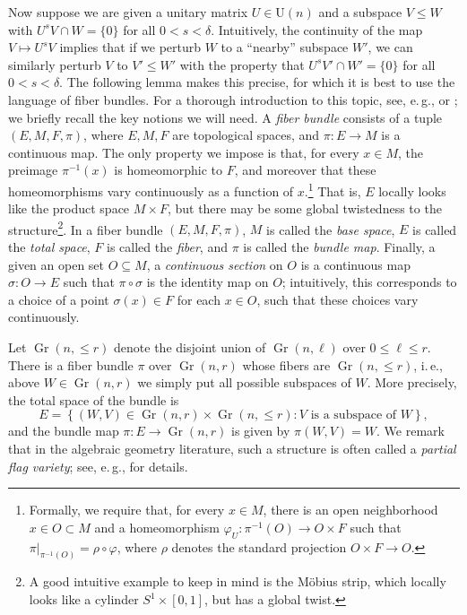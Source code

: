 \documentclass[11pt]{article}
\newcommand{\ie}{i.\,e.}
\newcommand{\eg}{e.\,g.}
\theoremstyle{plain}
\numberwithin{equation}{section}
\theoremstyle{definition}
\DeclareMathOperator\Gr{Gr}
\newcommand{\U}{\mathrm{U}}
\begin{document}
Now suppose we are given a unitary matrix $U\in \U(n)$ and a subspace $V \leq W$ with $U^s V \cap W = \{0\}$ for all $0<s<\delta$. Intuitively, the continuity of the map $V \mapsto U^s V$ implies that if we perturb $W$ to a ``nearby'' subspace $W'$, we can similarly perturb $V$ to $V' \leq W'$ with the property that $U^s V' \cap W' =\{0\}$ for all $0<s<\delta$. The following lemma makes this precise, for which it is best to use the language of fiber bundles. For a thorough introduction to this topic, see, \eg,  \cite{cohen_notes} or \cite[Section III.9]{KMS_books}; we briefly recall the key notions we will need. A \emph{fiber bundle} consists of a tuple $(E,M,F,\pi)$, where $E,M,F$ are topological spaces, and $\pi:E \to M$ is a continuous map. The only property we impose is that, for every $x \in M$, the preimage $\pi^{-1}(x)$ is homeomorphic to $F$, and moreover that these homeomorphisms 
%
vary continuously
%
as a function of $x$.\footnote{Formally, we require that, for every $x \in M$, there is an open neighborhood $x \in O \subset M$ and a homeomorphism $\varphi_U:\pi^{-1}(O) \to O \times F$ such that $\pi|_{\pi^{-1}(O)} = \rho \circ \varphi$, where $\rho$ denotes the standard projection $O \times F \to O$.} That is, $E$ 
%
locally looks like
%
the product space $M \times F$, but there may be some global 
%
twistedness
%
to the structure\footnote{A good intuitive example to keep in mind is the M\"obius strip, which locally looks like a cylinder $S^1 \times [0,1]$, but has a global twist.}. 
In a fiber bundle $(E,M,F,\pi)$, $M$ is called the \emph{base space}, $E$ is called the \emph{total space}, $F$ is called the \emph{fiber}, and $\pi$ is called the \emph{bundle map}. Finally, a given an open set $O \subseteq M$, a \emph{continuous section} on $O$ is a continuous map $\sigma:O \to E$ such that $\pi \circ \sigma$ is the identity map on $O$; intuitively, this corresponds to a choice of a point $\sigma(x) \in F$ for each $x \in O$, such that these choices 
%
vary continuously.
%

Let $\Gr(n,{\leq r})$ denote the disjoint union of $\Gr(n,\ell)$ over $0 \leq \ell \leq r$. There is a fiber bundle $\pi$ over $\Gr(n,r)$ whose fibers are $\Gr(n,{\leq r})$,
%
\ie,    %
above $W \in \Gr(n,r)$ we simply put all possible subspaces of $W$. More precisely, the total space of the bundle is
\[
    E = \left\{(W,V) \in \Gr(n,r) \times \Gr(n,{\leq r})  : V \text{ is a subspace of } W\right\},
\]
and the bundle map $\pi:E \to \Gr(n,r)$ is given by $\pi(W,V)=W$. We remark that in the algebraic geometry literature, such a structure is often called a \emph{partial flag variety}; see, \eg,  \cite[Example 8.30]{Harris_book} for details.
\end{document}
